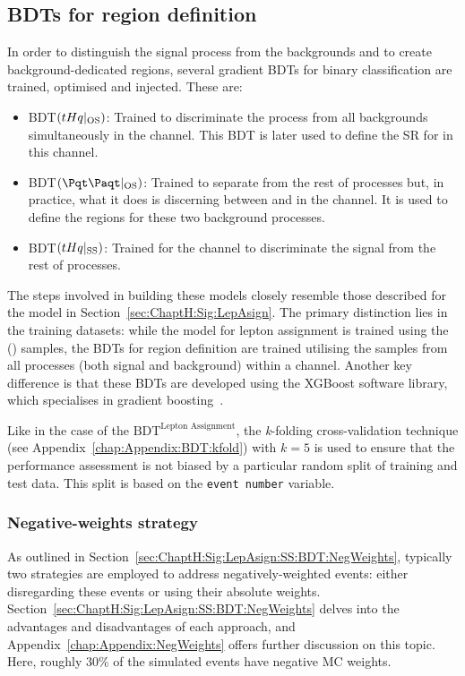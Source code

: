\subsection{BDTs for region definition}
\label{sec:ChaptH:EventSelection:BDT}
In order to distinguish the \tHq signal process from the backgrounds and to create background-dedicated regions, 
several gradient BDTs for binary classification are trained, optimised and injected. These are:
\begin{itemize}
   \item BDT$(tHq|_{\text{OS}})$: Trained to discriminate the \tHq process from all backgrounds simultaneously
   in the \dilepOStau channel. This BDT is later used to define the SR for \tHq in this channel.
   \item BDT$(\ttbar|_{\text{OS}})$: Trained to separate \ttbar from the rest of processes but, in practice, what it does
   is discerning between \ttbar and \Zjets in the \dilepOStau channel. It is used to define the regions for these two 
   background processes.
   \item  BDT$(tHq|_{\text{SS}})$:  Trained for the \dilepSStau channel to discriminate the \tHq signal from the rest of processes.
\end{itemize}
The steps involved in building these models closely resemble those described for the model in Section~\ref{sec:ChaptH:Sig:LepAsign}. 
The primary distinction lies in the training datasets: while the model for lepton assignment is trained using the \tHq(\dilepSStau) 
samples, the BDTs for region definition are trained utilising the samples from all processes (both signal and background) 
within a channel. Another key difference is that these BDTs are developed using the XGBoost software library, which specialises 
in gradient boosting~\cite{Chen_2016}. %

Like in the case of the $\text{BDT}^{\text{Lepton Assignment}}$, the \textit{k}-folding cross-validation technique (see Appendix~\ref{chap:Appendix:BDT:kfold})
with $k=5$ is used to ensure that the performance assessment is not biased by a particular 
random split of training and test data. This split is based on the \texttt{event number} variable.


\subsubsection{Negative-weights strategy}
\label{sec:ChaptH:EventSelection:BDT:NegativeWeights}
As outlined in Section~\ref{sec:ChaptH:Sig:LepAsign:SS:BDT:NegWeights}, typically two strategies 
are employed to address negatively-weighted events: either disregarding these events or using their 
absolute weights. Section~\ref{sec:ChaptH:Sig:LepAsign:SS:BDT:NegWeights} delves into the 
advantages and disadvantages of each approach, and Appendix~\ref{chap:Appendix:NegWeights} 
offers further discussion on this topic. Here, roughly 30\% of the simulated events have negative MC weights.

